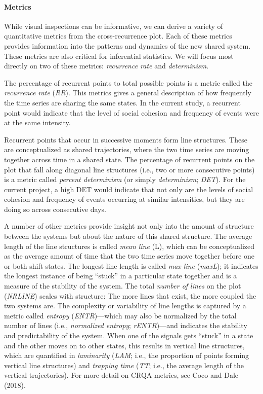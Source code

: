 \documentclass[
  english,
  man]{apa6}
\let\oldparagraph\paragraph
\renewcommand{\paragraph}[1]{\oldparagraph{#1}\mbox{}}
\begin{document}
\hypertarget{metrics}{%
\paragraph{Metrics}\label{metrics}}

While visual inspections can be informative, we can derive a variety of
quantitative metrics from the cross-recurrence plot. Each of these metrics
provides information into the patterns and dynamics of the new shared system.
These metrics are also critical for inferential statistics. We will focus most
directly on two of these metrics: \emph{recurrence rate} and \emph{determinism}.

The percentage of recurrent points to total possible points is a metric called
the \emph{recurrence rate} (\emph{RR}). This metrics gives a general description of how
frequently the time series are sharing the same states. In the current study, a
recurrent point would indicate that the level of social cohesion and frequency
of events were at the same intensity.

Recurrent points that occur in successive moments form line structures. These
are conceptualized as shared trajectories, where the two time series are moving
together across time in a shared state. The percentage of recurrent points on
the plot that fall along diagonal line structures (i.e., two or more consecutive
points) is a metric called \emph{percent determinism} (or simply \emph{determinism};
\emph{DET}). For the current project, a high DET would indicate that not only are the
levels of social cohesion and frequency of events occurring at similar
intensities, but they are doing so across consecutive days.

A number of other metrics provide insight not only into the amount of structure
between the systems but about the nature of this shared structure. The average
length of the line structures is called \emph{mean line} (L), which can be
conceptualized as the average amount of time that the two time series move
together before one or both shift states. The longest line length is called \emph{max
line} (\emph{maxL}); it indicates the longest instance of being \enquote{stuck} in a
particular state together and is a measure of the stability of the system. The
total \emph{number of lines} on the plot (\emph{NRLINE}) scales with structure: The more
lines that exist, the more coupled the two systems are. The complexity or
variability of line lengths is captured by a metric called \emph{entropy}
(\emph{ENTR})---which may also be normalized by the total number of lines (i.e.,
\emph{normalized entropy}; \emph{rENTR})---and indicates the stability and predictability
of the system. When one of the signals gets \enquote{stuck} in a state and the other
moves on to other states, this results in vertical line structures, which are
quantified in \emph{laminarity} (\emph{LAM}; i.e., the proportion of points forming
vertical line structures) and \emph{trapping time} (\emph{TT}; i.e., the average length of
the vertical trajectories). For more detail on CRQA metrics, see Coco and Dale (2018).
\end{document}
